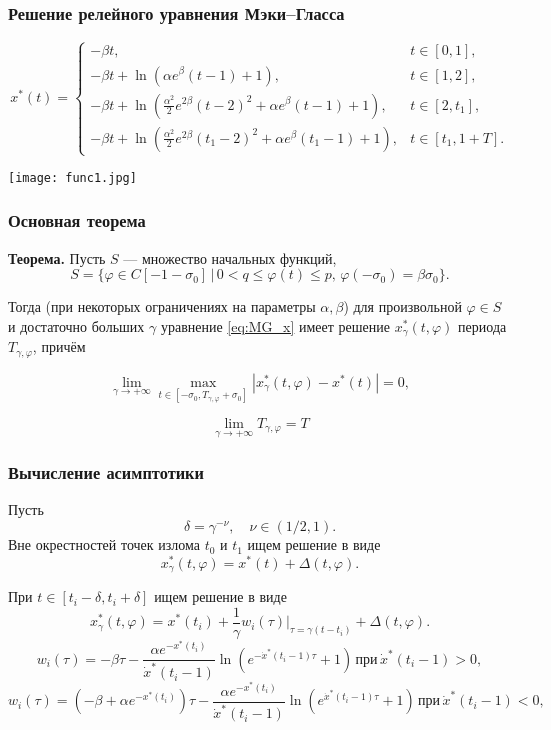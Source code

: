 \begin{frame}
	\frametitle{Решение релейного уравнения Мэки--Гласса}
	\begin{equation*}
	x^*(t)= 
		\begin{cases}
			-\beta t, & t\in[0, 1],\\
			-\beta t +\ln(\alpha e^{\beta}(t - 1)+1), & t\in[1, 2],\\
			-\beta t + \ln(\frac{\alpha^2}{2}e^{2\beta}(t - 2)^2 + \alpha e^{\beta}(t - 1)+1), & t\in[2, t_1],\\
			-\beta t + \ln(\frac{\alpha^2}{2}e^{2\beta}(t_1 - 2)^2 + \alpha e^{\beta}(t_1 - 1)+1), & t\in[t_1, 1 + T].
		\end{cases}
	\end{equation*}
    
    \begin{center}
    	\texttt{[image: func1.jpg]}
    \end{center}
\end{frame}

\begin{frame}
	\frametitle{Основная теорема}
	\textbf{Теорема.} Пусть $S$ --- множество начальных функций,
	\[
	S = \{\varphi \in C[-1 - \sigma_0] \, | \, 0 < q \leq \varphi(t) \leq p, \, \varphi(-\sigma_0) = \beta \sigma_0\}.
	\]
	
	Тогда (при некоторых ограничениях на параметры $\alpha, \beta$) для произвольной $\varphi \in S$ и достаточно больших $\gamma$ уравнение \eqref{eq:MG_x} имеет решение $x^*_\gamma(t, \varphi)$ периода $T_{\gamma, \varphi}$, причём
	
	\[
	\lim\limits_{\gamma \to +\infty} \max\limits_{t \in [-\sigma_0, T_{\gamma, \varphi} + \sigma_0]} |x^*_\gamma(t, \varphi) - x^*(t)| = 0,
	\]
	
	\[
	\lim\limits_{\gamma \to +\infty} T_{\gamma, \varphi} = T
	\]
\end{frame}

\begin{frame}
	\frametitle{Вычисление асимптотики}
	Пусть
	$$\delta = \gamma^{-\nu}, \quad \nu \in (1/2, 1).$$
	Вне окрестностей точек излома $t_0$ и $t_1$ ищем решение в виде
	\[
	x^*_\gamma(t, \varphi) = x^*(t) + \Delta(t, \varphi).
	\]
	
	При $t \in [t_i - \delta, t_i + \delta]$ ищем решение в виде
	\[
	x^*_\gamma(t, \varphi) = x^*(t_i) + \frac{1}{\gamma} w_i(\tau)|_{\tau = \gamma(t - t_i)} + \Delta(t, \varphi).
	\]
    \[
    w_i(\tau) = -\beta \tau - \dfrac{\alpha e^{-x^*(t_i)}}{\dot{x}^*(t_i - 1)} \ln\left(e^{-\dot{x}^*(t_i - 1)\tau} + 1\right) \, \text{при} \, \dot{x}^*(t_i - 1) > 0,
    \]
    \[
    w_i(\tau) = (-\beta + \alpha e^{-x^*(t_i)})\tau - \dfrac{\alpha e^{-x^*(t_i)}}{\dot{x}^*(t_i - 1)} \ln\left(e^{\dot{x}^*(t_i - 1)\tau} + 1\right) \, \text{при} \, \dot{x}^*(t_i - 1) < 0,
    \]
\end{frame}

